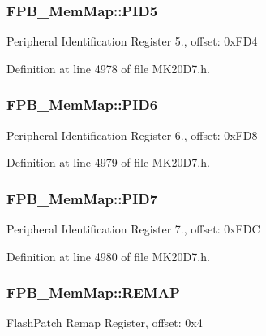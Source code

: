 \subsubsection[{\texorpdfstring{P\+I\+D5}{PID5}}]{ F\+P\+B\+\_\+\+Mem\+Map\+::\+P\+I\+D5}\hypertarget{struct_f_p_b___mem_map_a695321526b4704fe0e93fe59e4c88cce}{}\label{struct_f_p_b___mem_map_a695321526b4704fe0e93fe59e4c88cce}
Peripheral Identification Register 5., offset\+: 0x\+F\+D4 

Definition at line 4978 of file M\+K20\+D7.\+h.

\subsubsection[{\texorpdfstring{P\+I\+D6}{PID6}}]{ F\+P\+B\+\_\+\+Mem\+Map\+::\+P\+I\+D6}\hypertarget{struct_f_p_b___mem_map_a0b39a99cbc5776452682f777ac30b44e}{}\label{struct_f_p_b___mem_map_a0b39a99cbc5776452682f777ac30b44e}
Peripheral Identification Register 6., offset\+: 0x\+F\+D8 

Definition at line 4979 of file M\+K20\+D7.\+h.

\subsubsection[{\texorpdfstring{P\+I\+D7}{PID7}}]{ F\+P\+B\+\_\+\+Mem\+Map\+::\+P\+I\+D7}\hypertarget{struct_f_p_b___mem_map_afa51ab59e5a495de076915024e3e6adf}{}\label{struct_f_p_b___mem_map_afa51ab59e5a495de076915024e3e6adf}
Peripheral Identification Register 7., offset\+: 0x\+F\+DC 

Definition at line 4980 of file M\+K20\+D7.\+h.

\subsubsection[{\texorpdfstring{R\+E\+M\+AP}{REMAP}}]{ F\+P\+B\+\_\+\+Mem\+Map\+::\+R\+E\+M\+AP}\hypertarget{struct_f_p_b___mem_map_acdaa312f2de037db4f203b9cfd303772}{}\label{struct_f_p_b___mem_map_acdaa312f2de037db4f203b9cfd303772}
Flash\+Patch Remap Register, offset\+: 0x4 

